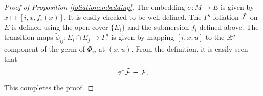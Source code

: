 \documentclass{article}
\newtheorem{proposed work}[theorem]{Proposed Work}
\theoremstyle{definition}
\begin{document}
\begin{proof}[Proof of Proposition \ref{foliationembedding}]
The embedding $\sigma: M \to E$ is given by $x \mapsto
[i,x,f_i(x)]$. It is easily checked to be well-defined. The
$\Gamma^q$-foliation $\tilde{\mathcal F}$ on $E$ is defined using the open
cover $\{ E_i \}$ and the submersion $\tilde{f}_i$ defined above. The
transition maps $\tilde{\phi}_{ij}: E_i \cap E_j \to \Gamma^q_1$ is
given by mapping $[i,x,u]$ to the $\mathbb R^q$ component of the germ of
$\Phi_{ij}$ at $(x,u)$. From the definition, it is easily seen that
\begin{equation*}
\sigma^*\tilde{\mathcal F} = \mathcal F.
\end{equation*}
This completes the proof.
\end{proof}

\printbibliography
\end{document}
